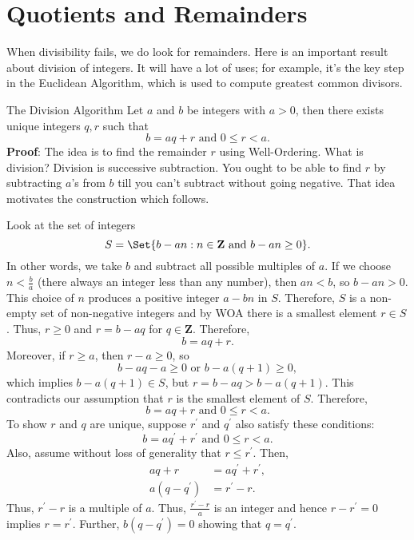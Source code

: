 \section{Quotients and Remainders}
When divisibility fails, we do look for remainders. Here is an important result about division of integers.
It will have a lot of uses; for example, it's the key
step in the Euclidean Algorithm, which is used to compute greatest common
divisors.
\begin{Theorem}{The Division Algorithm}{}
    Let $ a $ and $ b $ be integers with $ a>0 $, then there exists unique integers $ q,r $ such that
    \[ b=aq+r\text{ and }0\le r<a. \]
    \tcblower{}
    \textbf{Proof}: The idea is to find the remainder $r$ using Well-Ordering. What is
    division? Division is successive subtraction. You ought to be able to find $r$ by
    subtracting $a$'s from $b$ till you can't subtract without going negative. That idea
    motivates the construction which follows.

    Look at the set of integers
    \[ S=\Set{b-an\given n\in\mathbf{Z}\text{ and }b-an\ge 0}. \]
    In other words, we take $ b $ and subtract all possible multiples of $ a $. If we choose
    $ n<\frac{b}{a} $ (there always an integer less than any number), then $ an<b $, so $ b-an>0 $.
    This choice of $ n $ produces a positive integer $ a-bn $ in $ S $. Therefore, $ S $ is a non-empty
    set of non-negative integers and by WOA there is a smallest element $ r\in S $. Thus, $ r\ge 0 $ and $ r=b-aq $
    for $ q\in\mathbf{Z} $. Therefore,
    \[ b=aq+r. \]
    Moreover, if $ r\ge a $, then $ r-a\ge 0 $, so
    \[ b-aq-a\ge 0\text{ or }b-a(q+1)\ge 0, \]
    which implies $ b-a(q+1)\in S $, but $ r=b-aq>b-a(q+1) $. This contradicts
    our assumption that $r$ is the smallest element of $S$. Therefore,
    \[ b=aq+r\text{ and }0\le r<a. \]
    To show $ r $ and $ q $ are unique, suppose $ r^\prime $ and $ q^\prime $ also satisfy these conditions:
    \[ b=aq^\prime+r^\prime\text{ and }0\le r<a. \]
    Also, assume without loss of generality that $ r\le r^\prime $. Then,
    \begin{align*}
        aq+r          & =aq^\prime+r^\prime, \\
        a(q-q^\prime) & =r^\prime-r.
    \end{align*}
    Thus, $ r^\prime-r $ is a multiple of $ a $. Thus, $ \frac{r^\prime - r}{a} $ is an integer and hence $ r-r^\prime=0 $
    implies $ r=r^\prime$. Further, $ b(q-q^\prime)=0 $ showing that $ q=q^\prime $.
\end{Theorem}
